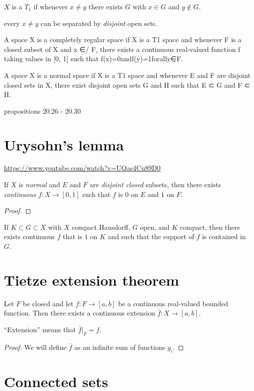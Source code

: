 \begin{definition*}

  $X$ is a $T_1$  if whenever $x \neq y$ there exists $G$ with $x \in G$ and $y \notin G$.

   every $x \neq y$ can be separated by {\it disjoint} open sets.

   A space X is a completely regular space if X is a T1 space and whenever F is a closed subset of X and x ∈/ F, there exists a continuous real-valued function f taking values in [0, 1] such that f(x)=0andf(y)=1forally∈F.

   A space X is a normal space if X is a T1 space and whenever E and F are disjoint closed sets in X, there exist disjoint open sets G and H such that E ⊂ G and F ⊂ H.

\end{definition*}

 propositions 20.26 - 20.30


\section{Urysohn's lemma}

\url{https://www.youtube.com/watch?v=UQas4Cu89D0}

\begin{theorem}
  If $X$ is {\it normal} and $E$ and $F$ are {\it disjoint closed} subsets, then there exists {\it continuous}
  $f: X \to [0, 1]$ such that $f$ is $0$ on $E$ and $1$ on $F$.
\end{theorem}

\begin{proof}
\end{proof}

\begin{corollary}
  If $K \subset G \subset X$ with $X$ compact Hausdorff, $G$ open, and $K$ compact, then there exists
  continuous $f$ that is $1$ on $K$ and such that the support of $f$ is contained in $G$.
\end{corollary}

\section{Tietze extension theorem}

\begin{theorem}
  Let $F$ be closed and let $f: F \to [a, b]$ be a continuous real-valued bounded function. Then there exists a
  continuous extension $\bar f: X \to [a, b]$.

  ``Extension​'' means that $\bar f|_F = f$.
\end{theorem}

\begin{proof}
  We will define $\bar f$ as an infinite sum of functions $g_i$.
\end{proof}


\section{Connected sets}
